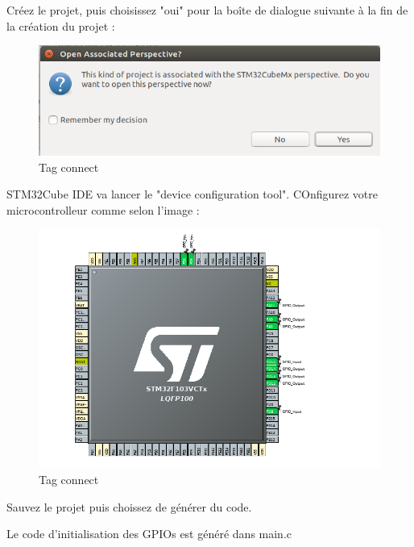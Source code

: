 \documentclass{article}
\begin{document}
Créez le projet, puis choisissez "oui" pour la boîte de dialogue suivante à la fin de la création du projet :
\begin{figure}[H]
\begin{center}
\advance\leftskip-3cm
\advance\rightskip-3cm
\includegraphics[keepaspectratio=true,scale=0.3]{end_projectcreation.png}
\caption{Tag connect}
\label{visina8}
\end{center}\end{figure}

STM32Cube IDE va lancer le "device configuration tool". COnfigurez votre microcontrolleur comme selon l'image :


\begin{figure}[H]
\begin{center}
\advance\leftskip-3cm
\advance\rightskip-3cm
\includegraphics[keepaspectratio=true,scale=0.3]{config_boutons_leds.png}
\caption{Tag connect}
\label{visina8}
\end{center}\end{figure}



Sauvez le projet puis choissez de générer du code.




Le code d'initialisation des GPIOs est généré dans main.c
\end{document}
